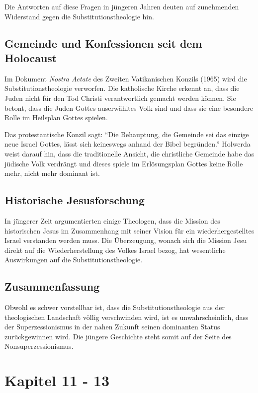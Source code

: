 \documentclass{../../inc/mybib}
\newcommand{\st}{Substitutionstheolog}
\newcommand{\sz}{Superzessionismus}
\begin{document}
    Die Antworten auf diese Fragen in jüngeren Jahren deuten auf zunehmenden Widerstand gegen die \st ie hin.

    \subsection{Gemeinde und Konfessionen seit dem Holocaust}
    Im Dokument \textit{Nostra Aetate} des Zweiten Vatikanischen Konzils (1965) wird die \st ie verworfen. Die katholische Kirche erkennt an, dass die Juden nicht für den Tod Christi verantwortlich gemacht werden können. Sie betont, dass die Juden Gottes auserwähltes Volk sind und dass sie eine besondere Rolle im Heilsplan Gottes spielen.

    Das protestantische Konzil sagt: \enquote{Die Behauptung, die Gemeinde sei das einzige neue Israel Gottes, lässt sich keineswegs anhand der Bibel begründen.} 
    Holwerda weist darauf hin, dass die traditionelle Ansicht, die christliche Gemeinde habe das jüdische Volk verdrängt und dieses spiele im Erlösungsplan Gottes keine Rolle mehr, nicht mehr dominant ist.

    \subsection{Historische Jesusforschung}
    In jüngerer Zeit argumentierten einige Theologen, dass die Mission des historischen Jesus im Zusammenhang mit seiner Vision für ein wiederhergestelltes Israel verstanden werden muss. Die Überzeugung, wonach sich die Mission Jesu direkt auf die Wiederherstellung des Volkes Israel bezog, hat wesentliche Auswirkungen auf die \st ie.

    \subsection{Zusammenfassung}
    Obwohl es schwer vorstellbar ist, dass die \st ie aus der theologischen Landschaft völlig verschwinden wird, ist es unwahrscheinlich, dass der \sz{} in der nahen Zukunft seinen dominanten Status zurückgewinnen wird. Die jüngere Geschichte steht somit auf der Seite des Nonsuperzessionismus.

    \section{Kapitel 11 - 13}
\end{document}
